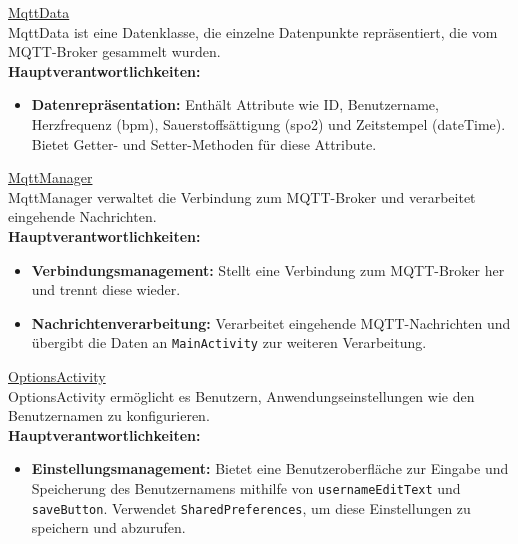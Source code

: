 \documentclass[conference,a4paper,flushend]{cs-techrep}
\begin{document}
\underline{MqttData}\vspace{0.5em}\\
MqttData ist eine Datenklasse, die einzelne Datenpunkte repräsentiert, die vom MQTT-Broker gesammelt wurden.\\

\textbf{Hauptverantwortlichkeiten:}
\begin{itemize}
    \item \textbf{Datenrepräsentation:} Enthält Attribute wie ID, Benutzername, Herzfrequenz (bpm), Sauerstoffsättigung (spo2) und Zeitstempel (dateTime). Bietet Getter- und Setter-Methoden für diese Attribute.
    \vspace{0.5em}
\end{itemize}

\underline{MqttManager}\vspace{0.5em}\\
MqttManager verwaltet die Verbindung zum MQTT-Broker und verarbeitet eingehende Nachrichten.\\

\textbf{Hauptverantwortlichkeiten:}
\begin{itemize}
    \vspace{0.5em}
    \item \textbf{Verbindungsmanagement:} Stellt eine Verbindung zum MQTT-Broker her und trennt diese wieder.
    \vspace{0.5em}
    \item \textbf{Nachrichtenverarbeitung:} Verarbeitet eingehende MQTT-Nachrichten und übergibt die Daten an \texttt{MainActivity} zur weiteren Verarbeitung.
    \vspace{0.5em}
\end{itemize}

\underline{OptionsActivity}\vspace{0.5em}\\
OptionsActivity ermöglicht es Benutzern, Anwendungseinstellungen wie den Benutzernamen zu konfigurieren.\vspace{3em}\\

\textbf{Hauptverantwortlichkeiten:}
\begin{itemize}
    \item \textbf{Einstellungsmanagement:} Bietet eine Benutzeroberfläche zur Eingabe und Speicherung des Benutzernamens mithilfe von \texttt{usernameEditText} und \texttt{saveButton}. Verwendet \texttt{SharedPreferences}, um diese Einstellungen zu speichern und abzurufen.
    \vspace{0.5em}
\end{itemize}
\end{document}
